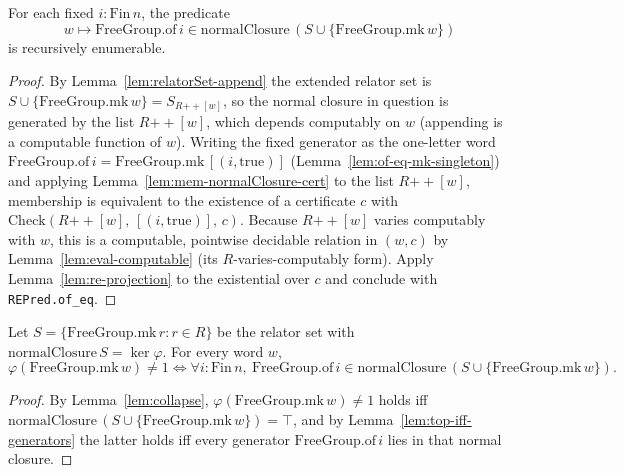 \begin{lemma}
    \label{lem:re-generator-mem}
    \leanok
    For each fixed $i : \mathrm{Fin}\,n$, the predicate
    \[
        w \mapsto \mathrm{FreeGroup.of}\,i \in
            \mathrm{normalClosure}\,(S \cup \{\mathrm{FreeGroup.mk}\,w\})
    \]
    is recursively enumerable.
\end{lemma}
\begin{proof}
    By Lemma~\ref{lem:relatorSet-append} the extended relator set is
    $S \cup \{\mathrm{FreeGroup.mk}\,w\} = S_{R \mathbin{+\!\!+} [w]}$, so the normal
    closure in question is generated by the list $R \mathbin{+\!\!+} [w]$, which
    depends computably on $w$ (appending is a computable function of $w$). Writing
    the fixed generator as the one-letter word
    $\mathrm{FreeGroup.of}\,i = \mathrm{FreeGroup.mk}\,[(i,\mathrm{true})]$
    (Lemma~\ref{lem:of-eq-mk-singleton}) and applying
    Lemma~\ref{lem:mem-normalClosure-cert} to the list $R \mathbin{+\!\!+} [w]$,
    membership is equivalent to the existence of a certificate $c$ with
    $\mathrm{Check}(R \mathbin{+\!\!+} [w],\, [(i,\mathrm{true})],\, c)$. Because
    $R \mathbin{+\!\!+} [w]$ varies computably with $w$, this is a computable,
    pointwise decidable relation in $(w, c)$ by Lemma~\ref{lem:eval-computable}
    (its $R$-varies-computably form). Apply Lemma~\ref{lem:re-projection} to the
    existential over $c$ and conclude with \texttt{REPred.of\_eq}.
\end{proof}

\begin{lemma}
    \label{lem:neg-iff-forall-gen}
    \leanok
    Let $S = \{\mathrm{FreeGroup.mk}\,r : r \in R\}$ be the relator set with
    $\mathrm{normalClosure}\,S = \ker\varphi$. For every word $w$,
    \[
        \varphi(\mathrm{FreeGroup.mk}\,w) \neq 1
        \iff \forall i : \mathrm{Fin}\,n,\ \mathrm{FreeGroup.of}\,i \in
            \mathrm{normalClosure}\,(S \cup \{\mathrm{FreeGroup.mk}\,w\}).
    \]
\end{lemma}
\begin{proof}
    By Lemma~\ref{lem:collapse}, $\varphi(\mathrm{FreeGroup.mk}\,w) \neq 1$ holds
    iff $\mathrm{normalClosure}\,(S \cup \{\mathrm{FreeGroup.mk}\,w\}) = \top$, and
    by Lemma~\ref{lem:top-iff-generators} the latter holds iff every generator
    $\mathrm{FreeGroup.of}\,i$ lies in that normal closure.
\end{proof}

